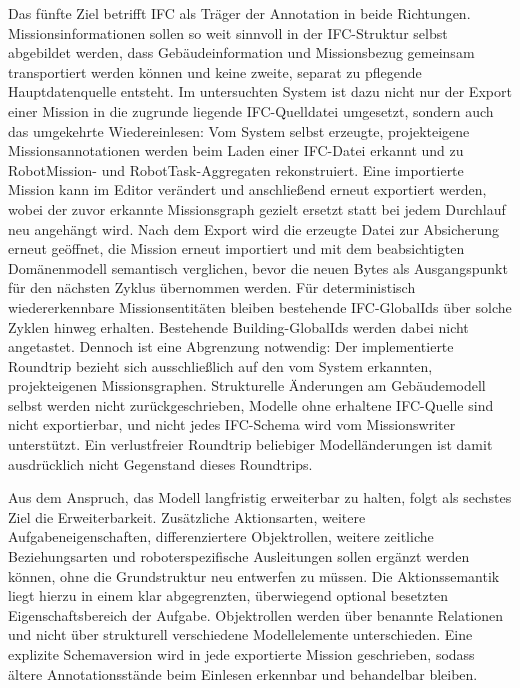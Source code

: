 Das fünfte Ziel betrifft IFC als Träger der Annotation in beide Richtungen. Missionsinformationen
sollen so weit sinnvoll in der IFC-Struktur selbst abgebildet werden, dass Gebäudeinformation und
Missionsbezug gemeinsam transportiert werden können und keine zweite, separat zu pflegende
Hauptdatenquelle entsteht. Im untersuchten System ist dazu nicht nur der Export einer Mission in die zugrunde
liegende IFC-Quelldatei umgesetzt, sondern auch das umgekehrte Wiedereinlesen: Vom System selbst
erzeugte, projekteigene Missionsannotationen werden beim Laden einer IFC-Datei erkannt und zu
RobotMission- und RobotTask-Aggregaten rekonstruiert. Eine importierte Mission kann im Editor
verändert und anschließend erneut exportiert werden, wobei der zuvor erkannte Missionsgraph gezielt
ersetzt statt bei jedem Durchlauf neu angehängt wird. Nach dem Export wird die erzeugte Datei zur
Absicherung erneut geöffnet, die Mission erneut importiert und mit dem beabsichtigten Domänenmodell
semantisch verglichen, bevor die neuen Bytes als Ausgangspunkt für den nächsten Zyklus übernommen
werden. Für deterministisch wiedererkennbare Missionsentitäten bleiben bestehende IFC-GlobalIds über
solche Zyklen hinweg erhalten. Bestehende Building-GlobalIds werden dabei nicht angetastet. Dennoch
ist eine Abgrenzung notwendig: Der implementierte Roundtrip bezieht sich ausschließlich auf den vom
System erkannten, projekteigenen Missionsgraphen. Strukturelle Änderungen am Gebäudemodell selbst
werden nicht zurückgeschrieben, Modelle ohne erhaltene IFC-Quelle sind nicht exportierbar, und nicht
jedes IFC-Schema wird vom Missionswriter unterstützt. Ein verlustfreier Roundtrip beliebiger
Modelländerungen ist damit ausdrücklich nicht Gegenstand dieses Roundtrips.

Aus dem Anspruch, das Modell langfristig erweiterbar zu halten, folgt als sechstes Ziel
die Erweiterbarkeit. Zusätzliche Aktionsarten, weitere Aufgabeneigenschaften, differenziertere
Objektrollen, weitere zeitliche Beziehungsarten und roboterspezifische Ausleitungen sollen ergänzt
werden können, ohne die Grundstruktur neu entwerfen zu müssen. Die Aktionssemantik liegt hierzu in
einem klar abgegrenzten, überwiegend optional besetzten Eigenschaftsbereich der Aufgabe.
Objektrollen werden über benannte Relationen und nicht über strukturell verschiedene Modellelemente
unterschieden. Eine explizite Schemaversion wird in jede exportierte Mission geschrieben, sodass
ältere Annotationsstände beim Einlesen erkennbar und behandelbar bleiben.

